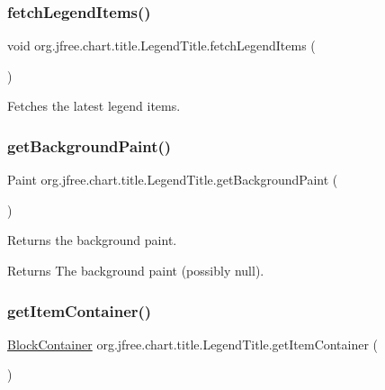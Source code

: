\subsubsection{\texorpdfstring{fetch\+Legend\+Items()}{fetchLegendItems()}}
{\footnotesize\ttfamily void org.\+jfree.\+chart.\+title.\+Legend\+Title.\+fetch\+Legend\+Items (\begin{DoxyParamCaption}{ }\end{DoxyParamCaption})\hspace{0.3cm}{\ttfamily [protected]}}

Fetches the latest legend items. \mbox{\label{classorg_1_1jfree_1_1chart_1_1title_1_1_legend_title_a21085fa0d5385b9984bb4f96019c253a}} 
\subsubsection{\texorpdfstring{get\+Background\+Paint()}{getBackgroundPaint()}}
{\footnotesize\ttfamily Paint org.\+jfree.\+chart.\+title.\+Legend\+Title.\+get\+Background\+Paint (\begin{DoxyParamCaption}{ }\end{DoxyParamCaption})}

Returns the background paint.

\begin{DoxyReturn}{Returns}
The background paint (possibly {\ttfamily null}). 
\end{DoxyReturn}
\mbox{\label{classorg_1_1jfree_1_1chart_1_1title_1_1_legend_title_a52f9e756bcaf0d94e67b6f5c59298200}} 
\subsubsection{\texorpdfstring{get\+Item\+Container()}{getItemContainer()}}
{\footnotesize\ttfamily \mbox{\hyperlink{classorg_1_1jfree_1_1chart_1_1block_1_1_block_container}{Block\+Container}} org.\+jfree.\+chart.\+title.\+Legend\+Title.\+get\+Item\+Container (\begin{DoxyParamCaption}{ }\end{DoxyParamCaption})}

